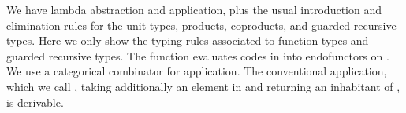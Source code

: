 \begin{AgdaAlign}
We have lambda abstraction and application, plus the usual
introduction and elimination rules for the unit types, products, 
coproducts, and guarded recursive types. Here we only show the typing rules associated to function types and guarded recursive types.
The function  evaluates codes in   into endofunctors on  .
We use a categorical combinator  for application.
The conventional application, which we call \F{\$}, taking additionally an element
in    and returning an inhabitant of   , is derivable.
\begin{code}%
%
\>[4]\AgdaSpace{}%
\AgdaSymbol{:}\AgdaSpace{}%
\AgdaSpace{}%
\AgdaSymbol{\{}\AgdaSymbol{\}}\AgdaSpace{}%
\AgdaSymbol{\{}\AgdaSpace{}%
\AgdaSymbol{:}\AgdaSpace{}%
\AgdaSpace{}%
\AgdaSymbol{\}}\AgdaSpace{}%
\AgdaSymbol{\{}\AgdaSpace{}%
\AgdaSpace{}%
\AgdaSymbol{:}\AgdaSpace{}%
\AgdaSpace{}%
\AgdaSymbol{\}}\AgdaSpace{}%
\AgdaSpace{}%
\AgdaSpace{}%
\AgdaSymbol{(}\AgdaSpace{}%
\AgdaOperator{\AgdaInductiveConstructor{,}}\AgdaSpace{}%
\AgdaSymbol{)}\AgdaSpace{}%
\AgdaSpace{}%
\AgdaSpace{}%
\AgdaSpace{}%
\AgdaSpace{}%
\AgdaSymbol{(}\AgdaSpace{}%
\AgdaSpace{}%
\AgdaSymbol{)}\<%
\\
%
\>[4]\AgdaSpace{}%
\AgdaSymbol{:}\AgdaSpace{}%
\AgdaSpace{}%
\AgdaSymbol{\{}\AgdaSymbol{\}}\AgdaSpace{}%
\AgdaSymbol{\{}\AgdaSpace{}%
\AgdaSymbol{:}\AgdaSpace{}%
\AgdaSpace{}%
\AgdaSymbol{\}}\AgdaSpace{}%
\AgdaSymbol{\{}\AgdaSpace{}%
\AgdaSpace{}%
\AgdaSymbol{:}\AgdaSpace{}%
\AgdaSpace{}%
\AgdaSymbol{\}}\AgdaSpace{}%
\AgdaSpace{}%
\AgdaSpace{}%
\AgdaSpace{}%
\AgdaSymbol{(}\AgdaSpace{}%
\AgdaSpace{}%
\AgdaSymbol{)}\AgdaSpace{}%
\AgdaSpace{}%
\AgdaSpace{}%
\AgdaSymbol{(}\AgdaSpace{}%
\AgdaOperator{\AgdaInductiveConstructor{,}}\AgdaSpace{}%
\AgdaSymbol{)}\AgdaSpace{}%
\<%
\\
%
\>[4]\AgdaSpace{}%

\end{code}
\end{AgdaAlign}
